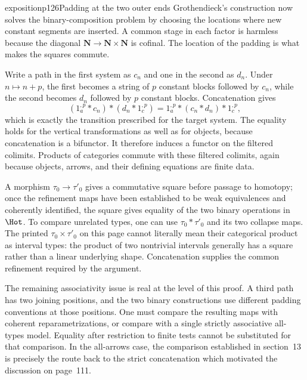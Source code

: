 \begin{dcomment}{exposition}{p126}{Padding at the two outer ends}
Grothendieck's construction now solves the binary-composition problem by choosing the locations where new constant segments are inserted. A common stage in each factor is harmless because the diagonal $\mathbf N\to\mathbf N\times\mathbf N$ is cofinal. The location of the padding is what makes the squares commute.

Write a path in the first system as $c_n$ and one in the second as $d_n$. Under $n\mapsto n+p$, the first becomes a string of $p$ constant blocks followed by $c_n$, while the second becomes $d_n$ followed by $p$ constant blocks. Concatenation gives
\[
 (1_a^{,p}*c_n)*(d_n*1_c^{,p})
       =1_a^{,p}*(c_n*d_n)*1_c^{,p},
\]
which is exactly the transition prescribed for the target system. The equality holds for the vertical transformations as well as for objects, because concatenation is a bifunctor. It therefore induces a functor on the filtered colimits. Products of categories commute with these filtered colimits, again because objects, arrows, and their defining equations are finite data.

A morphism $\tau_0\to\tau'_0$ gives a commutative square before passage to homotopy; once the refinement maps have been established to be weak equivalences and coherently identified, the square gives equality of the two binary operations in $\Hot$. To compare unrelated types, one can use $\tau_0*\tau'_0$ and its two collapse maps. The printed $\tau_0\times\tau'_0$ on this page cannot literally mean their categorical product as interval types: the product of two nontrivial intervals generally has a square rather than a linear underlying shape. Concatenation supplies the common refinement required by the argument.

The remaining associativity issue is real at the level of this proof. A third path has two joining positions, and the two binary constructions use different padding conventions at those positions. One must compare the resulting maps with coherent reparametrizations, or compare with a single strictly associative all-types model. Equality after restriction to finite tests cannot be substituted for that comparison. In the all-arrows case, the comparison established in section~13 is precisely the route back to the strict concatenation which motivated the discussion on page~111.
\end{dcomment}

